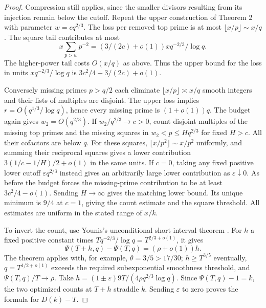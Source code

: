 \begin{proof}
Compression still applies, since the smaller divisors resulting from its injection remain below the cutoff. Repeat the upper construction of Theorem 2 with parameter $w=cq^{2/3}$. The loss per removed top prime is at most $\lfloor x/p\rfloor\sim x/q$. The square tail contributes at most
\[
 x\sum_{p>w}p^{-2}=(3/(2c)+o(1))xq^{-2/3}/\log q.
\]
The higher-power tail costs $O(x/q)$ as above. Thus the upper bound for the loss in units $xq^{-2/3}/\log q$ is $3c^2/4+3/(2c)+o(1)$.

Conversely missing primes $p>q/2$ each eliminate $\lfloor x/p\rfloor\asymp x/q$ smooth integers and their lists of multiples are disjoint. The upper loss implies $r=O(q^{1/3}/\log q)$, hence every missing prime is $(1+o(1))q$. The budget again gives $w_2=O(q^{2/3})$. If $w_2/q^{2/3}\to c>0$, count disjoint multiples of the missing top primes and the missing squares in $w_2<p\le Hq^{2/3}$ for fixed $H>c$. All their cofactors are below $q$. For these squares, $\lfloor x/p^2\rfloor\sim x/p^2$ uniformly, and summing their reciprocal squares gives a lower contribution $3(1/c-1/H)/2+o(1)$ in the same units. If $c=0$, taking any fixed positive lower cutoff $\varepsilon q^{2/3}$ instead gives an arbitrarily large lower contribution as $\varepsilon\downarrow0$. As before the budget forces the missing-prime contribution to be at least $3c^2/4-o(1)$. Sending $H\to\infty$ gives the matching lower bound. Its unique minimum is $9/4$ at $c=1$, giving the count estimate and the square threshold. All estimates are uniform in the stated range of $x/k$.

To invert the count, use Younis's unconditional short-interval theorem \cite[Theorem 1.1]{younis}. For $h$ a fixed positive constant times $Tq^{-2/3}/\log q=T^{2/3+o(1)}$, it gives
\[
 \Psi(T+h,q)-\Psi(T,q)=(\rho+o(1))h.
\]
The theorem applies with, for example, $\theta=3/5>17/30$; $h\ge T^{3/5}$ eventually, $q=T^{1/2+o(1)}$ exceeds the required subexponential smoothness threshold, and $\Psi(T,q)/T\to\rho$. Take $h=(1\pm\varepsilon)9T/(4\rho q^{2/3}\log q)$. Since $\Psi(T,q)-1=k$, the two optimized counts at $T+h$ straddle $k$. Sending $\varepsilon$ to zero proves the formula for $D(k)-T$.


\end{proof}
